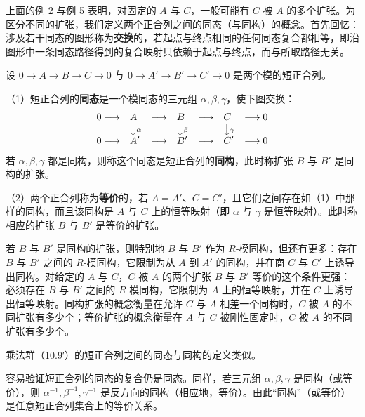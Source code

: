 上面的例 2 与例 5 表明，对固定的 \(A\) 与 \(C\)，一般可能有 \(C\) 被 \(A\) 的多个扩张。为区分不同的扩张，我们定义两个正合列之间的同态（与同构）的概念。首先回忆：涉及若干同态的图形称为\textbf{交换}的，若起点与终点相同的任何同态复合都相等，即沿图形中一条同态路径得到的复合映射只依赖于起点与终点，而与所取路径无关。

\begin{definition}
设 \(0 \to A \to B \to C \to 0\) 与 \(0 \to A' \to B' \to C' \to 0\) 是两个模的短正合列。

（1）短正合列的\textbf{同态}是一个模同态的三元组 \(\alpha, \beta, \gamma\)，使下图交换：
\[
\begin{array}{lllllll}
0 \longrightarrow & A & \longrightarrow & B & \longrightarrow & C & \longrightarrow 0\\
& \big\downarrow{\scriptstyle\alpha} & & \big\downarrow{\scriptstyle\beta} & & \big\downarrow{\scriptstyle\gamma} & \\
0 \longrightarrow & A' & \longrightarrow & B' & \longrightarrow & C' & \longrightarrow 0
\end{array}
\]
若 \(\alpha, \beta, \gamma\) 都是同构，则称这个同态是短正合列的\textbf{同构}，此时称扩张 \(B\) 与 \(B'\) 是同构的扩张。

（2）两个正合列称为\textbf{等价}的，若 \(A = A'\)、\(C = C'\)，且它们之间存在如（1）中那样的同构，而且该同构是 \(A\) 与 \(C\) 上的恒等映射（即 \(\alpha\) 与 \(\gamma\) 是恒等映射）。此时称相应的扩张 \(B\) 与 \(B'\) 是等价的扩张。
\end{definition}

若 \(B\) 与 \(B'\) 是同构的扩张，则特别地 \(B\) 与 \(B'\) 作为 \(R\)-模同构，但还有更多：存在 \(B\) 与 \(B'\) 之间的 \(R\)-模同构，它限制为从 \(A\) 到 \(A'\) 的同构，并在商 \(C\) 与 \(C'\) 上诱导出同构。对给定的 \(A\) 与 \(C\)，\(C\) 被 \(A\) 的两个扩张 \(B\) 与 \(B'\) 等价的这个条件更强：必须存在 \(B\) 与 \(B'\) 之间的 \(R\)-模同构，它限制为 \(A\) 上的恒等映射，并在 \(C\) 上诱导出恒等映射。同构扩张的概念衡量在允许 \(C\) 与 \(A\) 相差一个同构时，\(C\) 被 \(A\) 的不同扩张有多少个；等价扩张的概念衡量在 \(A\) 与 \(C\) 被刚性固定时，\(C\) 被 \(A\) 的不同扩张有多少个。

乘法群（10.9′）的短正合列之间的同态与同构的定义类似。

容易验证短正合列的同态的复合仍是同态。同样，若三元组 \(\alpha, \beta, \gamma\) 是同构（或等价），则 \(\alpha^{-1}, \beta^{-1}, \gamma^{-1}\) 是反方向的同构（相应地，等价）。由此“同构”（或等价）是任意短正合列集合上的等价关系。

